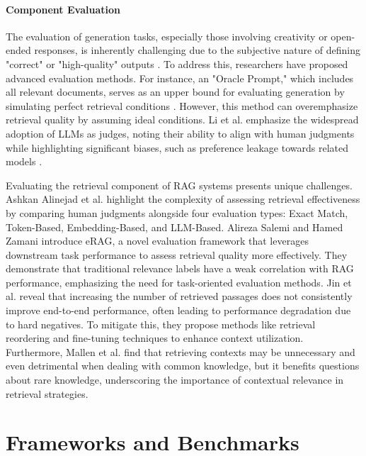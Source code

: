 \paragraph{Component Evaluation}
The evaluation of generation tasks, especially those involving creativity or open-ended responses, is inherently challenging due to the subjective nature of defining "correct" or "high-quality" outputs \cite{Yu.2024}. To address this, researchers have proposed advanced evaluation methods. For instance, an "Oracle Prompt," which includes all relevant documents, serves as an upper bound for evaluating generation by simulating perfect retrieval conditions \cite{Krishna.19.09.2024}. However, this method can overemphasize retrieval quality by assuming ideal conditions. Li et al. emphasize the widespread adoption of LLMs as judges, noting their ability to align with human judgments while highlighting significant biases, such as preference leakage towards related models \cite{Li.13.01.2025}.

Evaluating the retrieval component of RAG systems presents unique challenges. Ashkan Alinejad et al.\cite{Alinejad.2024} highlight the complexity of assessing retrieval effectiveness by comparing human judgments alongside four evaluation types: Exact Match, Token-Based, Embedding-Based, and LLM-Based. Alireza Salemi and Hamed Zamani\cite{Salemi.2024} introduce eRAG, a novel evaluation framework that leverages downstream task performance to assess retrieval quality more effectively. They demonstrate that traditional relevance labels have a weak correlation with RAG performance, emphasizing the need for task-oriented evaluation methods. Jin et al.\cite{Jin.19.09.2024} reveal that increasing the number of retrieved passages does not consistently improve end-to-end performance, often leading to performance degradation due to hard negatives. To mitigate this, they propose methods like retrieval reordering and fine-tuning techniques to enhance context utilization. Furthermore, Mallen et al. \cite{Mallen.2023} find that retrieving contexts may be unnecessary and even detrimental when dealing with common knowledge, but it benefits questions about rare knowledge, underscoring the importance of contextual relevance in retrieval strategies.

\section{Frameworks and Benchmarks}


